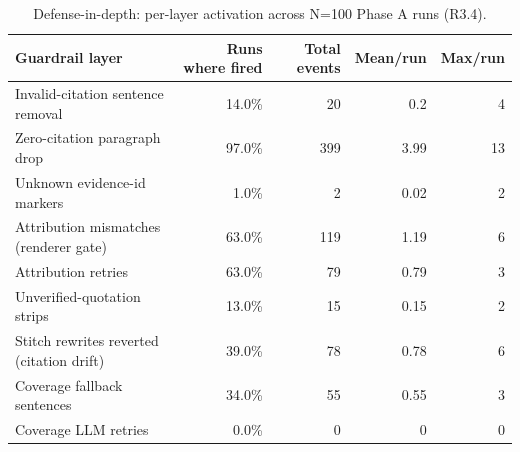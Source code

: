 \begin{table}[ht]
\centering
\caption{Defense-in-depth: per-layer activation across N=100 Phase A runs (R3.4).}
\begin{tabular}{lrrrr}
\toprule
Guardrail layer & Runs where fired & Total events & Mean/run & Max/run \\
\midrule
Invalid-citation sentence removal & 14.0\% & 20 & 0.2 & 4 \\
Zero-citation paragraph drop & 97.0\% & 399 & 3.99 & 13 \\
Unknown evidence-id markers & 1.0\% & 2 & 0.02 & 2 \\
Attribution mismatches (renderer gate) & 63.0\% & 119 & 1.19 & 6 \\
Attribution retries & 63.0\% & 79 & 0.79 & 3 \\
Unverified-quotation strips & 13.0\% & 15 & 0.15 & 2 \\
Stitch rewrites reverted (citation drift) & 39.0\% & 78 & 0.78 & 6 \\
Coverage fallback sentences & 34.0\% & 55 & 0.55 & 3 \\
Coverage LLM retries & 0.0\% & 0 & 0 & 0 \\
\bottomrule
\end{tabular}
\end{table}
